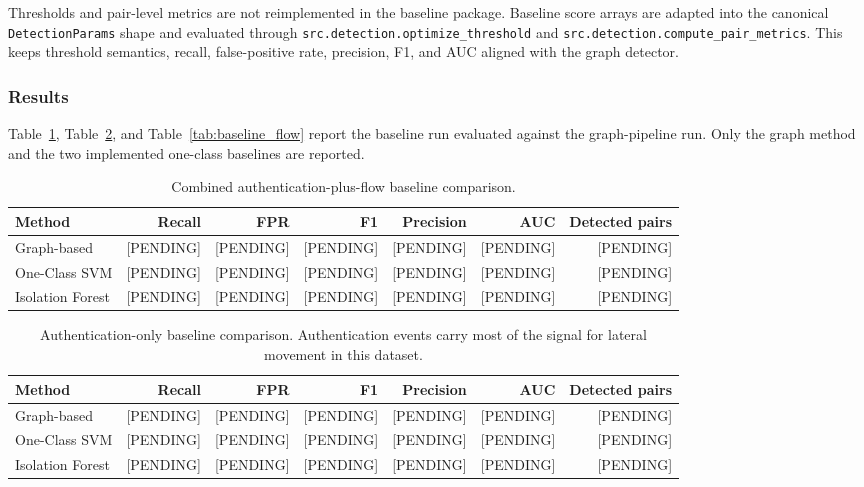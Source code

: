 Thresholds and pair-level metrics are not reimplemented in the baseline package. Baseline score arrays are adapted into the canonical \texttt{DetectionParams} shape and evaluated through \texttt{src.detection.optimize\_threshold} and \texttt{src.detection.compute\_pair\_metrics}. This keeps threshold semantics, recall, false-positive rate, precision, F1, and AUC aligned with the graph detector.

\subsubsection{Results}

Table~\ref{tab:baseline_combined}, Table~\ref{tab:baseline_auth}, and Table~\ref{tab:baseline_flow} report the baseline run evaluated against the graph-pipeline run. Only the graph method and the two implemented one-class baselines are reported.


\begin{table}[h]
\centering
\small
\begin{tabular}{lrrrrrr}
\hline
Method & Recall & FPR & F1 & Precision & AUC & Detected pairs \\
\hline
Graph-based      & [PENDING] & [PENDING] & [PENDING] & [PENDING] & [PENDING] & [PENDING] \\
One-Class SVM    & [PENDING] & [PENDING] & [PENDING] & [PENDING] & [PENDING] & [PENDING] \\
Isolation Forest & [PENDING] & [PENDING] & [PENDING] & [PENDING] & [PENDING] & [PENDING] \\
\hline
\end{tabular}
\caption{Combined authentication-plus-flow baseline comparison.}
\label{tab:baseline_combined}
\end{table}

\begin{table}[h]
\centering
\small
\begin{tabular}{lrrrrrr}
\hline
Method & Recall & FPR & F1 & Precision & AUC & Detected pairs \\
\hline
Graph-based      & [PENDING] & [PENDING] & [PENDING] & [PENDING] & [PENDING] & [PENDING] \\
One-Class SVM    & [PENDING] & [PENDING] & [PENDING] & [PENDING] & [PENDING] & [PENDING] \\
Isolation Forest & [PENDING] & [PENDING] & [PENDING] & [PENDING] & [PENDING] & [PENDING] \\
\hline
\end{tabular}
\caption{Authentication-only baseline comparison. Authentication events carry most of the signal for lateral movement in this dataset.}
\label{tab:baseline_auth}
\end{table}


